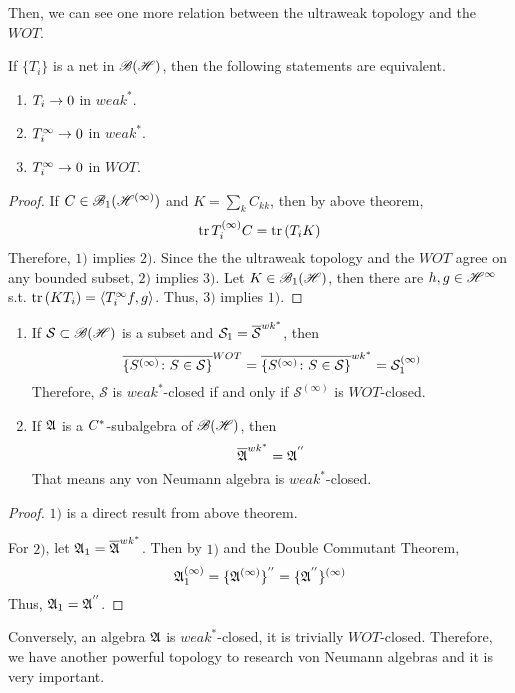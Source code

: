 Then, we can see one more relation between the ultraweak topology and the $WOT$.

\begin{thm}
	If $\{T_i\}$ is a net in $\mathscr{B(H)}$, then the following statements are equivalent.
	\begin{enumerate}[label = \arabic*)]
		\item $T_i \rightarrow 0$ in $weak^{*}$.
		\item $T_i^{\infty} \rightarrow 0$ in $weak^{*}$.
		\item $T_i^{\infty} \rightarrow 0$ in $WOT$.
	\end{enumerate}
\end{thm}
\begin{proof}
	If $C \in \mathscr{B}_1(\mathscr{H}^{(\infty)})$ and $K = \sum_k C_{kk}$, then by above theorem,
	\begin{equation*}
		\operatorname{tr}{T_i^{(\infty)}C} = \operatorname{tr}{(T_iK)}
	\end{equation*}
 	Therefore, $1)$ implies $2)$. Since the the ultraweak topology and the $WOT$ agree on any bounded subset, $2)$ implies $3)$. Let $K \in \mathscr{B}_{1}\mathscr{(H)}$, then there are $h,g \in \mathscr{H}^{\infty}$ s.t. $\operatorname{tr}{(KT_i)} = \langle T_i^{\infty}f,g \rangle$. Thus, $3)$ implies $1)$.
\end{proof}

\begin{cor}
	\begin{enumerate}[label=\arabic*)]
		\item If $\mathcal{S} \subset \mathscr{B(H)}$ is a subset and $\mathcal{S}_1 = \overline{\mathcal{S}}^{wk^{*}}$, then 
		\begin{equation*}
			\overline{\{S^{(\infty)} \colon S \in \mathcal{S}\}}^{WOT} = \overline{\{S^{(\infty)} \colon S \in \mathcal{S}\}}^{wk^{*}} = \mathcal{S}_1^{(\infty)}
		\end{equation*}
		Therefore, $\mathcal{S}$ is $weak^{*}$-closed if and only if $\mathcal{S}^{(\infty)}$ is $WOT$-closed.
		\item If $\mathfrak{A}$ is a $C^{*}$-subalgebra of $\mathscr{B(H)}$, then
		\begin{equation*}
			\overline{\mathfrak{A}}^{wk^{*}} = \mathfrak{A}^{''}
		\end{equation*}
		That means any von Neumann algebra is $weak^{*}$-closed.
	\end{enumerate}
\end{cor}
\begin{proof}
	$1)$ is a direct result from above theorem.
	\item For $2)$, let $\mathfrak{A}_1 = \overline{\mathfrak{A}}^{wk^{*}}$. Then by $1)$ and the Double Commutant Theorem,
	\begin{equation*}
		\mathfrak{A}_1^{(\infty)} = \{\mathfrak{A}^{(\infty)}\}^{''} = \{\mathfrak{A}^{''}\}^{(\infty)}
	\end{equation*}
	Thus, $\mathfrak{A}_1 = \mathfrak{A}^{''} $.
\end{proof}
\begin{rem}
	Conversely, an algebra $\mathfrak{A}$ is $weak^{*}$-closed, it is trivially $WOT$-closed. Therefore, we have another powerful topology to research von Neumann algebras and it is very important.
\end{rem}

